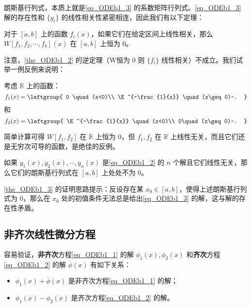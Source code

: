 朗斯基行列式，本质上就是\autoref{eq_ODEb1_3} 的系数矩阵行列式。\autoref{eq_ODEb1_3} 解的存在性和 $\{y_i\}$ 的线性相关性紧密相连，因此我们有以下定理：




\begin{theorem}{}\label{the_ODEb1_2}
对于 $[a, b]$ 上的函数 $f_i(x)$，如果它们在给定区间上线性相关，那么 $W[f_1, f_2, \cdots, f_k](x)$ 在 $[a, b]$ 上恒为 $0$。
\end{theorem}

注意，\autoref{the_ODEb1_2} 的逆定理（W恒为 $0$ 则 $\{f_i\}$ 线性相关）不成立。我们试举一例反例来说明：

\begin{example}{}
考虑 $\mathbb{R}$ 上的函数：
\begin{equation}
f_1(x)=\leftgroup{
    0 \quad(x<0)\\
    \E^{-\frac{1}{x}} \quad (x\geq 0)~.
}
\end{equation}
和
\begin{equation}
f_2(x)=\leftgroup{
    \E^{-\frac{1}{x}} \quad(x<0)\\
    0\quad(x\geq 0)~.
}
\end{equation}

简单计算可得 $W[f_1, f_2]$ 在 $\mathbb{R}$ 上恒为 $0$，但 $f_1, f_2$ 在 $\mathbb{R}$ 上线性无关，而且它们还是无穷次可导的函数，是绝佳的反例。




\end{example}

\begin{theorem}{}\label{the_ODEb1_3}
如果 $y_1(x), y_2(x), \cdots, y_n(x)$ 是\autoref{eq_ODEb1_2} 的 $n$ 个解且它们线性无关，那么它们的朗斯基行列式在 $[a, b]$ 上处处不为 $0$。
\end{theorem}

\autoref{the_ODEb1_3} 的证明思路提示：反设存在某 $x_0\in[a, b]$，使得上述朗斯基行列式为 $0$，那么在 $x_0$ 处的初值条件无法总是给出\autoref{eq_ODEb1_3} 的解，这与解的存在性矛盾。




\subsection{非齐次线性微分方程}

容易验证，\textbf{非齐次}方程\autoref{eq_ODEb1_1} 的解 ${\phi}_1(x), \phi_2(x)$ 和\textbf{齐次}方程\autoref{eq_ODEb1_2} 的解 $\overline{\phi}(x)$ 有如下关系：
\begin{itemize}
\item $\phi_1(x)+\overline{\phi}(x)$ 是非齐次方程\autoref{eq_ODEb1_1} 的解；
\item $\phi_1(x)-\phi_2(x)$ 是齐次方程\autoref{eq_ODEb1_2} 的解。
\end{itemize}

